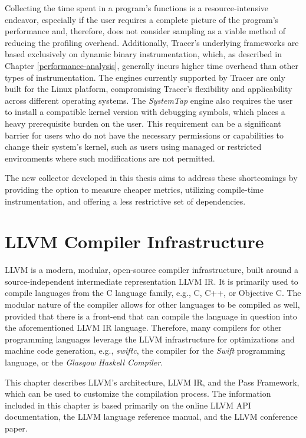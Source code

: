Collecting the time spent in a program's functions is a resource-intensive endeavor, especially if the user requires a complete picture of the program's performance and, therefore, does not consider sampling as a viable method of reducing the profiling overhead. Additionally, Tracer's underlying frameworks are based exclusively on dynamic binary instrumentation, which, as described in Chapter \ref{performance-analysis}, generally incurs higher time overhead than other types of instrumentation. The engines currently supported by Tracer are only built for the Linux platform, compromising Tracer's flexibility and applicability across different operating systems. The \emph{SystemTap} engine also requires the user to install a compatible kernel version with debugging symbols, which places a heavy prerequisite burden on the user. This requirement can be a significant barrier for users who do not have the necessary permissions or capabilities to change their system's kernel, such as users using managed or restricted environments where such modifications are not permitted.

The new collector developed in this thesis aims to address these shortcomings by providing the option to measure cheaper metrics, utilizing compile-time instrumentation, and offering a less restrictive set of dependencies.



\chapter{LLVM Compiler Infrastructure}
\label{llvm}

LLVM is a modern, modular, open-source compiler infrastructure, built around a source-independent intermediate representation LLVM IR. It is primarily used to compile languages from the C language family, e.g., C, C++, or Objective C. The modular nature of the compiler allows for other languages to be compiled as well, provided that there is a front-end that can compile the language in question into the aforementioned LLVM IR language. Therefore, many compilers for other programming languages leverage the LLVM infrastructure for optimizations and machine code generation, e.g., \emph{swiftc}, the compiler for the \emph{Swift} programming language, or the \emph{Glasgow Haskell Compiler}. \cite{swift-docs, haskell-docs}

This chapter describes LLVM's architecture, LLVM IR, and the Pass Framework, which can be used to customize the compilation process. The information included in this chapter is based primarily on the online LLVM API documentation, the LLVM language reference manual, and the LLVM conference paper. \cite{llvm-api, llvm-lang-ref, llvm-paper}
